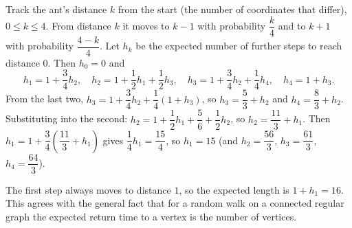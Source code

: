 Track the ant's distance $k$ from the start (the number of coordinates that differ), $0\le k\le4$. From distance $k$ it moves to $k-1$ with probability $\dfrac {k}{4}$ and to $k+1$ with probability $\dfrac{4-k}{4}$. Let $h_k$ be the expected number of further steps to reach distance $0$. Then $h_0=0$ and
\[
h_1=1+\dfrac{3}{4}h_2,\quad h_2=1+\dfrac{1}{2}h_1+\dfrac{1}{2}h_3,\quad h_3=1+\dfrac{3}{4}h_2+\dfrac{1}{4}h_4,\quad h_4=1+h_3 .
\]
From the last two, $h_3=1+\dfrac{3}{4}h_2+\dfrac{1}{4}(1+h_3)$, so $h_3=\dfrac{5}{3}+h_2$ and $h_4=\dfrac{8}{3}+h_2$. Substituting into the second: $h_2=1+\dfrac{1}{2}h_1+\dfrac{5}{6}+\dfrac{1}{2}h_2$, so $h_2=\dfrac{11}{3}+h_1$. Then $h_1=1+\dfrac{3}{4}\left(\dfrac{11}{3}+h_1\right)$ gives $\dfrac{1}{4}h_1=\dfrac{15}{4}$, so $h_1=15$ (and $h_2=\dfrac{56}{3}$, $h_3=\dfrac{61}{3}$, $h_4=\dfrac{64}{3}$).

The first step always moves to distance $1$, so the expected length is $1+h_1=\boxed{16}$. This agrees with the general fact that for a random walk on a connected regular graph the expected return time to a vertex is the number of vertices.
